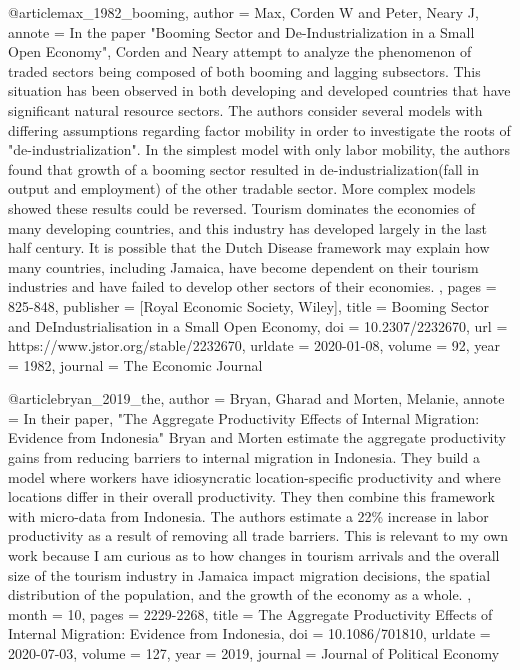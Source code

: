 @article{max_1982_booming,
	author = {Max, Corden W and Peter, Neary J},
	annote = {  In the paper "Booming Sector and De-Industrialization in a Small Open Economy", Corden and Neary attempt to analyze the phenomenon of traded sectors being composed of both booming and lagging subsectors. This situation has been observed in both developing and developed countries that have significant natural resource sectors. The authors consider several models with differing assumptions regarding factor mobility in order to investigate the roots of "de-industrialization". In the simplest model with only labor mobility, the authors found that growth of a booming sector resulted in de-industrialization(fall in output and employment) of the other tradable sector. More complex models showed these results could be reversed. Tourism dominates the economies of many developing countries, and this industry has developed largely in the last half century. It is possible that the Dutch Disease framework may explain how many countries, including Jamaica, have become dependent on their tourism industries and have failed to develop other sectors of their economies. },
	pages = {825-848},
	publisher = {[Royal Economic Society, Wiley]},
	title = {Booming Sector and DeIndustrialisation in a Small Open Economy},
	doi = {10.2307/2232670},
	url = {https://www.jstor.org/stable/2232670},
	urldate = {2020-01-08},
	volume = {92},
	year = {1982},
	journal = {The Economic Journal}
}

@article{bryan_2019_the,
	author = {Bryan, Gharad and Morten, Melanie},
	annote = {In their paper, "The Aggregate Productivity Effects of Internal Migration: Evidence from Indonesia" Bryan and Morten estimate the aggregate productivity gains from reducing barriers to internal migration in Indonesia. They build a model where workers have idiosyncratic location-specific productivity and where locations differ in their overall productivity. They then combine this framework with micro-data from Indonesia. The authors estimate a 22\% increase in labor productivity as a result of removing all trade barriers. This is relevant to my own work because I am curious as to how changes in tourism arrivals and the overall size of the tourism industry in Jamaica impact migration decisions, the spatial distribution of the population, and the growth of the economy as a whole. },
	month = {10},
	pages = {2229-2268},
	title = {The Aggregate Productivity Effects of Internal Migration: Evidence from Indonesia},
	doi = {10.1086/701810},
	urldate = {2020-07-03},
	volume = {127},
	year = {2019},
	journal = {Journal of Political Economy}
}

